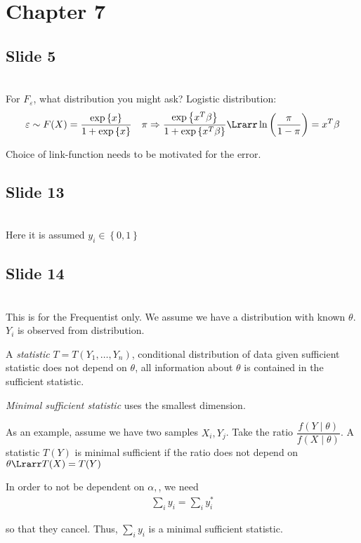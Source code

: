\section{Chapter 7}
\subsection{Slide 5}\hfill\\
\noindent For $F_\varepsilon$, what distribution you might ask? Logistic distribution:
\begin{equation*}
  \begin{gathered}
    \varepsilon\sim F(X) = \dfrac{\text{exp}\left\{x\right\}}{1+\text{exp}\left\{x\right\}}\quad \pi\Rightarrow\dfrac{\text{exp}\left\{x^T\beta\right\}}{1+\text{exp}\left\{x^T\beta\right\}}\Lrarr \ln{\left(\dfrac{\pi}{1-\pi}\right)} = x^T\beta
  \end{gathered}
\end{equation*}\par
\noindent Choice of link-function needs to be motivated for the error.
\par\bigskip
\subsection{Slide 13}\hfill\\
\noindent Here it is assumed $y_i\in\left\{0,1\right\}$
\par\bigskip
\subsection{Slide 14}\hfill\\
\noindent This is for the Frequentist only. We assume we have a distribution with known $\theta$. $Y_i$ is observed from distribution.\par
\noindent A \textit{statistic }$T = T(Y_1,\ldots, Y_n)$, conditional distribution of data given sufficient statistic does not depend on $\theta$, all information about $\theta$ is contained in the sufficient statistic.\par
\noindent \textit{Minimal sufficient statistic}  uses the smallest dimension. \par
\noindent As an example, assume we have two samples $X_i, Y_j$. Take the ratio $\dfrac{f(Y\mid\theta)}{f(X\mid\theta)}$. A statistic $T(Y)$ is minimal sufficient if the ratio does not depend on $\theta\Lrarr T(X) = T(Y)$\par
\noindent In order to not be dependent on $\alpha, $, we need 
\begin{equation*}
  \begin{gathered}
    \sum_i y_i = \sum_i y_i^*
  \end{gathered}
\end{equation*}\par
\noindent so that they cancel. Thus, $\sum_i y_i$  is a minimal sufficient statistic.
\par\bigskip
